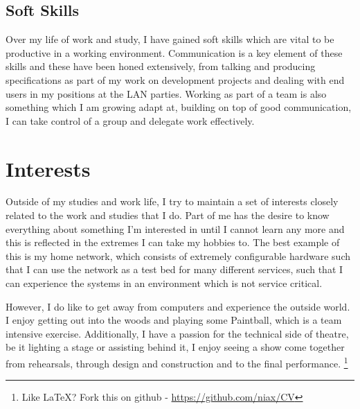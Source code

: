 \documentclass[11pt]{report}
\newcommand\blfootnote[1]{%
	\begingroup
	\renewcommand\thefootnote{}\footnote{#1}%
	\addtocounter{footnote}{-1}%
	\endgroup
}
\begin{document}
\subsection*{Soft Skills}
Over my life of work and study, I have gained soft skills which are vital to be productive in a working environment.
Communication is a key element of these skills and these have been honed extensively, from talking and producing specifications as part of my work on development projects and dealing with end users in my positions at the LAN parties.
Working as part of a team is also something which I am growing adapt at, building on top of good communication, I can take control of a group and delegate work effectively.
\section*{Interests}
Outside of my studies and work life, I try to maintain a set of interests closely related to the work and studies that I do.
Part of me has the desire to know everything about something I'm interested in until I cannot learn any more and this is reflected in the extremes I can take my hobbies to.
The best example of this is my home network, which consists of extremely configurable hardware such that I can use the network as a test bed for many different services, such that I can experience the systems in an environment which is not service critical.

However, I do like to get away from computers and experience the outside world. I enjoy getting out into the woods and playing some Paintball, which is a team intensive exercise.
Additionally, I have a passion for the technical side of theatre, be it lighting a stage or assisting behind it, I enjoy seeing a show come together from rehearsals, through design and construction and to the final performance.
\blfootnote{Like \LaTeX? Fork this on github - \url{https://github.com/niax/CV}}
\end{document}
